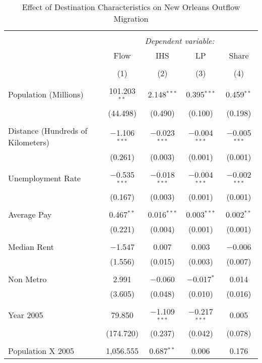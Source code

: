 \documentclass[]{article}
\begin{document}
\begin{table}[!htbp] \centering 
  \caption{\label{reg:regmain}Effect of Destination Characteristics on New Orleans Outflow Migration} 
  \label{} 
\scriptsize 
\begin{tabular}{@{\extracolsep{5pt}}lcccc} 
\\[-1.8ex]\hline 
\hline \\[-1.8ex] 
 & \multicolumn{4}{c}{\textit{Dependent variable:}} \\ 
\cline{2-5} 
 & Flow & IHS & LP & Share \\ 
\\[-1.8ex] & (1) & (2) & (3) & (4)\\ 
\hline \\[-1.8ex] 
 Population (Millions) & 101.203$^{**}$ & 2.148$^{***}$ & 0.395$^{***}$ & 0.459$^{**}$ \\ 
  & (44.498) & (0.490) & (0.100) & (0.198) \\ 
  & & & & \\ 
 Distance (Hundreds of Kilometers) & $-$1.106$^{***}$ & $-$0.023$^{***}$ & $-$0.004$^{***}$ & $-$0.005$^{***}$ \\ 
  & (0.261) & (0.003) & (0.001) & (0.001) \\ 
  & & & & \\ 
 Unemployment Rate & $-$0.535$^{***}$ & $-$0.018$^{***}$ & $-$0.004$^{***}$ & $-$0.002$^{***}$ \\ 
  & (0.167) & (0.003) & (0.001) & (0.001) \\ 
  & & & & \\ 
 Average Pay & 0.467$^{**}$ & 0.016$^{***}$ & 0.003$^{***}$ & 0.002$^{**}$ \\ 
  & (0.221) & (0.004) & (0.001) & (0.001) \\ 
  & & & & \\ 
 Median Rent & $-$1.547 & 0.007 & 0.003 & $-$0.006 \\ 
  & (1.556) & (0.015) & (0.003) & (0.007) \\ 
  & & & & \\ 
 Non Metro & 2.991 & $-$0.060 & $-$0.017$^{*}$ & 0.014 \\ 
  & (3.605) & (0.048) & (0.010) & (0.016) \\ 
  & & & & \\ 
 Year 2005 & 79.850 & $-$1.109$^{***}$ & $-$0.217$^{***}$ & 0.005 \\ 
  & (174.720) & (0.237) & (0.042) & (0.078) \\ 
  & & & & \\ 
 Population X 2005 & 1,056.555 & 0.687$^{**}$ & 0.006 & 0.176 \\ 

\end{tabular}
\end{table}
\end{document}
